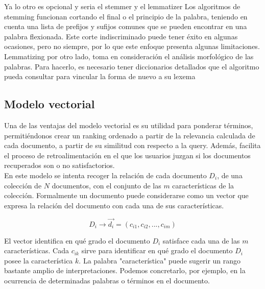 \documentclass[runningheads,a4paper]{llncs}
\begin{document}
Ya lo otro es opcional y seria el stemmer y el lemmatizer
Los algoritmos de stemming funcionan cortando el final o el principio de la palabra, teniendo en cuenta una lista de prefijos y sufijos comunes que se pueden encontrar en una palabra flexionada. Este corte indiscriminado puede tener éxito en algunas ocasiones, pero no siempre, por lo que este enfoque presenta algunas limitaciones.\\

Lemmatizing por otro lado, toma en consideración el análisis morfológico de las palabras. Para hacerlo, es necesario tener diccionarios detallados que el algoritmo pueda consultar para vincular la forma de nuevo a su lexema


\subsection*{Modelo vectorial}
Una de las ventajas del modelo vectorial es su utilidad para ponderar términos, permitiéndonos crear un ranking ordenado a partir de la relevancia calculada de cada documento, a partir de su similitud con respecto a la query. Además, facilita el proceso de retroalimentación en el que los usuarios juzgan si los documentos recuperados son o no satisfactorios.\\
En este modelo se intenta recoger la relación de cada documento $D_i$, de una colección de $N$ documentos, con el conjunto de las $m$ características de la colección. Formalmente un documento puede considerarse como un vector que expresa la relación del documento con cada una de sus características.

$$ D_i \rightarrow \vec{d_i} = (c_{i1}, c_{i2}, ... , c_{im})$$

El vector identifica en qué grado el documento $D_i$ satisface cada una de las $m$ características. Cada $c_{ik}$ sirve para identificar en qué grado el documento $D_i$ posee la característica $k$. La palabra "característica" puede sugerir un rango bastante amplio de interpretaciones. Podemos concretarlo, por ejemplo, en la ocurrencia de determinadas palabras o términos en el documento.\\
\end{document}
